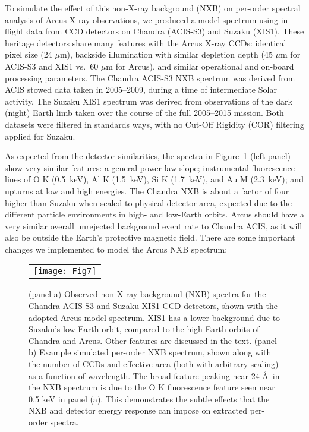 \documentclass[12pt]{spieman}  %
\begin{document}
\begin{spacing}{2}
To simulate the effect of this non-X-ray background (NXB) on per-order spectral analysis of Arcus X-ray observations, we produced a model spectrum using in-flight data from CCD detectors on Chandra (ACIS-S3) and Suzaku (XIS1). These heritage detectors share many features with the Arcus X-ray CCDs: identical pixel size (24 $\mu$m), backside illumination with similar depletion depth (45 $\mu$m for ACIS-S3 and XIS1 vs.\ 60 $\mu$m for Arcus), and similar operational and on-board processing parameters. The Chandra ACIS-S3 NXB spectrum was derived from ACIS stowed data taken in 2005--2009, during a time of intermediate Solar activity. The Suzaku XIS1 spectrum was derived from observations of the dark (night) Earth limb taken over the course of the full 2005--2015 mission. Both datasets were filtered in standards ways, with no Cut-Off Rigidity (COR) filtering applied for Suzaku\cite{Tawaetal2008}.

As expected from the detector similarities, the spectra in Figure~\ref{fig:nxb} (left panel) show very similar features: a general power-law slope; instrumental fluorescence lines of O K (0.5~keV), Al K (1.5~keV), Si K (1.7~keV), and Au M (2.3~keV); and upturns at low and high energies. The Chandra NXB is about a factor of four higher than Suzaku when scaled to physical detector area, expected due to the different particle environments in high- and low-Earth orbits. Arcus should have a very similar overall unrejected background event rate to Chandra ACIS, as it will also be outside the Earth's protective magnetic field. There are some important changes we implemented to model the Arcus NXB spectrum:

\begin{figure} [t]
    \begin{center}
    \begin{tabular}{c} %
    \texttt{[image: Fig7]}
    \end{tabular}
    \end{center}
    \caption {\label{fig:nxb}
    (panel a) Observed non-X-ray background (NXB) spectra for the Chandra ACIS-S3 and Suzaku XIS1 CCD detectors, shown with the adopted Arcus model spectrum. XIS1 has a lower background due to Suzaku's low-Earth orbit, compared to the high-Earth orbits of Chandra and Arcus. Other features are discussed in the text. (panel b) Example simulated per-order NXB spectrum, shown along with the number of CCDs and effective area (both with arbitrary scaling) as a function of wavelength. The broad feature peaking near 24 \AA\ in the NXB spectrum is due to the O K fluorescence feature seen near 0.5 keV in panel (a). This demonstrates the subtle effects that the NXB and detector energy response can impose on extracted per-order spectra.
    }
\end{figure}


\end{spacing}
\end{document}
